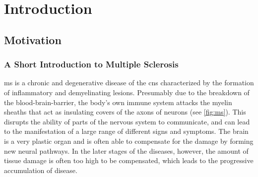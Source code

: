 \chapter{Introduction}


\section{Motivation}

\subsection[A short introduction to multiple sclerosis]{A Short Introduction to
Multiple Sclerosis}

\Gls{ms} is a chronic and degenerative disease of the \gls{cns} characterized by
the formation of inflammatory and demyelinating lesions. Presumably due to the
breakdown of the blood-brain-barrier, the body's own immune system attacks the
myelin sheaths that act as insulating covers of the axons of neurons (see
\ref{fig:ms}). This disrupts the ability of parts of the nervous system to
communicate, and can lead to the manifestation of a large range of different
signs and symptoms. The brain is a very plastic organ and is often able to
compensate for the damage by forming new neural pathways. In the later stages of
the diseases, however, the amount of tissue damage is often too high to be
compensated, which leads to the progressive accumulation of disease.

